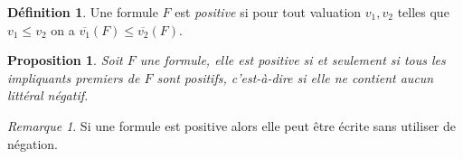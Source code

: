 \documentclass[]{article}
\newtheorem{myproposition}{Proposition}
\theoremstyle{remark}
\newtheorem{myrem}{Remarque}
\theoremstyle{definition}
\newtheorem{mydef}{Définition}
\begin{document}
\begin{mydef}
	Une formule $F$ est \textit{positive} si pour tout valuation $v_1, v_2$ telles que $v_1 \leqslant v_2$ on a $\overline{v_1}(F) \leqslant \overline{v_2}(F)$.
\end{mydef}

\begin{myproposition}
	Soit $F$ une formule, elle est positive si et seulement si tous les impliquants premiers de $F$ sont positifs, c'est-à-dire si elle ne contient aucun littéral négatif.
\end{myproposition}

\begin{myrem}
	Si une formule est positive alors elle peut être écrite sans utiliser de négation.
\end{myrem}
\end{document}
